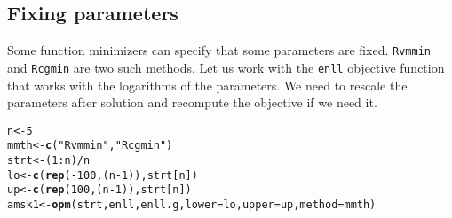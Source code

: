 \documentclass[11pt]{article}\usepackage[]{graphicx}\usepackage[]{color}
\makeatletter
\newcommand{\hlnum}[1]{\textcolor[rgb]{0.686,0.059,0.569}{#1}}%
\newcommand{\hlstr}[1]{\textcolor[rgb]{0.192,0.494,0.8}{#1}}%
\newcommand{\hlopt}[1]{\textcolor[rgb]{0,0,0}{#1}}%
\newcommand{\hlstd}[1]{\textcolor[rgb]{0.345,0.345,0.345}{#1}}%
\newcommand{\hlkwb}[1]{\textcolor[rgb]{0.69,0.353,0.396}{#1}}%
\newcommand{\hlkwc}[1]{\textcolor[rgb]{0.333,0.667,0.333}{#1}}%
\newcommand{\hlkwd}[1]{\textcolor[rgb]{0.737,0.353,0.396}{\textbf{#1}}}%
\newenvironment{kframe}{%
 \def\at@end@of@kframe{}%
 \ifinner\ifhmode%
  \def\at@end@of@kframe{\end{minipage}}%
  \begin{minipage}{\columnwidth}%
 \fi\fi%
 \def\FrameCommand##1{\hskip\@totalleftmargin \hskip-\fboxsep
 \colorbox{shadecolor}{##1}\hskip-\fboxsep
     \hskip-\linewidth \hskip-\@totalleftmargin \hskip\columnwidth}%
 \MakeFramed {\advance\hsize-\width
   \@totalleftmargin\z@ \linewidth\hsize
   \@setminipage}}%
 {\par\unskip\endMakeFramed%
 \at@end@of@kframe}
\newenvironment{knitrout}{}{} %
\newcommand{\code}[1]{{\tt#1}}
\makeatother
\begin{document}
\subsection{Fixing parameters}

Some function minimizers can specify that some parameters are fixed. \code{Rvmmin} and
\code{Rcgmin} are two such methods. Let us work with the \code{enll} objective function
that works with the logarithms of the parameters.
We need to rescale the parameters after solution and recompute the objective if we need it.

\begin{knitrout}\scriptsize
{}\color{fgcolor}\begin{kframe}
\begin{alltt}
\hlstd{n}\hlkwb{<-}\hlnum{5}
\hlstd{mmth} \hlkwb{<-} \hlkwd{c}\hlstd{(}\hlstr{"Rvmmin"}\hlstd{,} \hlstr{"Rcgmin"}\hlstd{)}
\hlstd{strt} \hlkwb{<-} \hlstd{(}\hlnum{1}\hlopt{:}\hlstd{n)}\hlopt{/}\hlstd{n}
\hlstd{lo} \hlkwb{<-} \hlkwd{c}\hlstd{(}\hlkwd{rep}\hlstd{(}\hlopt{-}\hlnum{100}\hlstd{, (n}\hlopt{-}\hlnum{1}\hlstd{)),strt[n])}
\hlstd{up} \hlkwb{<-} \hlkwd{c}\hlstd{(}\hlkwd{rep}\hlstd{(}\hlnum{100}\hlstd{, (n}\hlopt{-}\hlnum{1}\hlstd{)),strt[n])}
\hlstd{amsk1} \hlkwb{<-} \hlkwd{opm}\hlstd{(strt, enll, enll.g,} \hlkwc{lower}\hlstd{=lo,} \hlkwc{upper}\hlstd{=up,} \hlkwc{method}\hlstd{=mmth)}
\end{alltt}


{\ttfamily\noindent\color{warningcolor}{\#\# Warning in bmchk(par, lower = lower, upper = upper): Masks (fixed parameters) set by bmchk due to tight bounds. CAUTION!!}}

{\ttfamily\noindent\color{warningcolor}{\#\# Warning in bmchk(par, lower = lower, upper = upper): Masks (fixed parameters) set by bmchk due to tight bounds. CAUTION!!}}


\end{kframe}
\end{knitrout}
\end{document}
